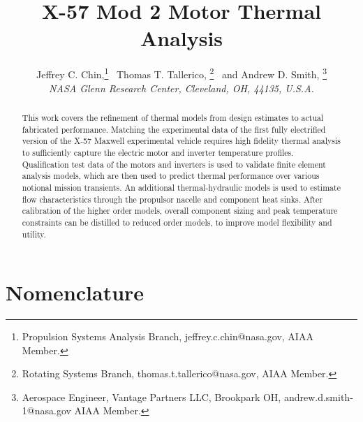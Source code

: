 \documentclass[]{aiaa-tc}%
\title{X-57 Mod 2 Motor Thermal Analysis}
\author{
  Jeffrey C. Chin,\thanks{Propulsion Systems Analysis Branch, jeffrey.c.chin@nasa.gov, AIAA Member.} \
  Thomas T. Tallerico, \thanks{Rotating Systems Branch, thomas.t.tallerico@nasa.gov, AIAA Member.} \
  and Andrew D. Smith, \thanks{Aerospace Engineer, Vantage Partners LLC, Brookpark OH, andrew.d.smith-1@nasa.gov AIAA Member.} \\
  {\normalsize \itshape NASA Glenn Research Center, Cleveland, OH, 44135, U.S.A.} }
\begin{document}
\maketitle

\begin{abstract}

This work covers the refinement of thermal models from design estimates to actual fabricated performance. Matching the experimental data of the first fully electrified version of the X-57 Maxwell experimental vehicle requires high fidelity thermal analysis to sufficiently capture the electric motor and inverter temperature profiles. Qualification test data of the motors and inverters is used to validate finite element analysis models, which are then used to predict thermal performance over various notional mission transients. An additional thermal-hydraulic models is used to estimate flow characteristics through the propulsor nacelle and component heat sinks. After calibration of the higher order models, overall component sizing and peak temperature constraints can be distilled to reduced order models, to improve model flexibility and utility. 



\end{abstract}


%
\section{Nomenclature}
\end{document}
